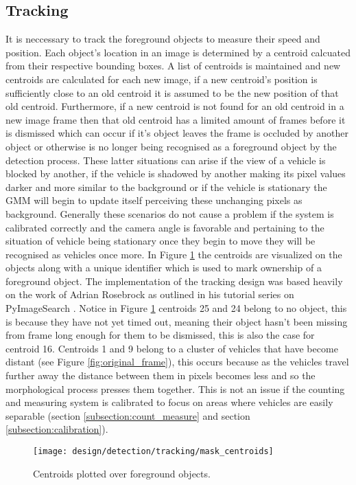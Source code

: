 \subsection{Tracking}

It is neccessary to track the foreground objects to measure their speed and position. Each object's location in an image is determined by a centroid calcuated from their respective bounding boxes. A list of centroids is maintained and new centroids are calculated for each new image, if a new centroid's position is sufficiently close to an old centroid it is assumed to be the new position of that old centroid. Furthermore, if a new centroid is not found for an old centroid in a new image frame then that old centroid has a limited amount of frames before it is dismissed which can occur if it's object leaves the frame is occluded by another object or otherwise is no longer being recognised as a foreground object by the detection process. These latter situations can arise if the view of a vehicle is blocked by another, if the vehicle is shadowed by another making its pixel values darker and more similar to the background or if the vehicle is stationary the GMM will begin to update itself perceiving these unchanging pixels as background. Generally these scenarios do not cause a problem if the system is calibrated correctly and the camera angle is favorable and pertaining to the situation of vehicle being stationary once they begin to move they will be recognised as vehicles once more. In Figure \ref{fig:centroids} the centroids are visualized on the objects along with a unique identifier which is used to mark ownership of a foreground object. The implementation of the tracking design was based heavily on the work of Adrian Rosebrock as outlined in his tutorial series on PyImageSearch \cite{adrian_rosebrock_simple_object_tracking}. Notice in Figure \ref{fig:centroids} centroids 25 and 24 belong to no object, this is because they have not yet timed out, meaning their object hasn't been missing from frame long enough for them to be dismissed, this is also the case for centroid 16. Centroids 1 and 9 belong to a cluster of vehicles that have become distant (see Figure \ref{fig:original_frame}), this occurs because as the vehicles travel further away the distance between them in pixels becomes less and so the morphological process presses them together. This is not an issue if the counting and measuring system is calibrated to focus on areas where vehicles are easily separable (section \ref{subsection:count_measure} and section \ref{subsection:calibration}).   


\begin{figure}[H]
    \centering
    \centering\texttt{[image: design/detection/tracking/mask\_centroids]}
    \caption{Centroids plotted over foreground objects.}
    \label{fig:centroids}
  \end{figure}
  
